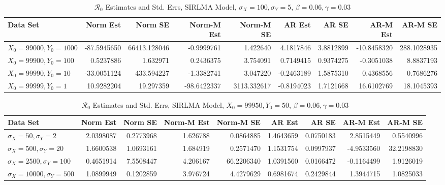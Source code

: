 \message{ !name(draft_v13.tex)}\documentclass[12pt]{article}
\newcommand{\rr}{\ensuremath{\mathcal{R}_0}}
\begin{document}
\begin{table}[H]
	
	\caption{\label{tab:}$\rr$ Estimates and Std. Errs, SIRLMA Model,
		$\sigma_X = 100, \sigma_Y = 5$, $\beta = 0.06, \gamma = 0.03$}
	\centering
	\begin{footnotesize}
		\begin{tabular}[t]{l|r|r|r|r|r|r|r|r}
			\hline
			Data Set & Norm Est & Norm SE & Norm-M Est & Norm-M SE & AR Est & AR SE & AR-M Est & AR-M SE\\
			\hline
			$X_0 = 99000, Y_0 = 1000$ & -87.5945650 & 66413.128046 & -0.9999761 & 1.422640 & 4.1817846 & 3.8812899 & -10.8458320 & 288.1028935\\
			\hline
			$X_0 = 99900, Y_0 = 100$ & 0.5237886 & 1.632971 & 0.2436375 & 3.754091 & 0.7149415 & 0.9374275 & -0.3051038 & 8.8837193\\
			\hline
			$X_0 = 99990, Y_0 = 10$ & -33.0051124 & 433.594227 & -1.3382741 & 3.047220 & -0.2463189 & 1.5875310 & 0.4368556 & 0.7686276\\
			\hline
			$X_0 = 99999, Y_0 = 1$ & 10.9282204 & 19.297359 & -98.6422337 & 3113.332617 & -0.8194023 & 1.7121668 & 16.6102769 & 18.1045393\\
			\hline
		\end{tabular}
	\end{footnotesize}
\end{table}

\begin{table}[H]
	
	\caption{\label{tab:}$\rr$ Estimates and Std. Errs, SIRLMA Model,
		$X_0 = 99950, Y_0 = 50$, $\beta = 0.06, \gamma = 0.03$}
	\centering
	\begin{footnotesize}
		\begin{tabular}[t]{l|r|r|r|r|r|r|r|r}
			\hline
			Data Set & Norm Est & Norm SE & Norm-M Est & Norm-M SE & AR Est & AR SE & AR-M Est & AR-M SE\\
			\hline
			$\sigma_X = 50, \sigma_Y = 2$ & 2.0398087 & 0.2773968 & 1.626788 & 0.0864885 & 1.4643659 & 0.0750183 & 2.8515449 & 0.5540996\\
			\hline
			$\sigma_X = 500, \sigma_Y = 20$ & 1.6600538 & 1.0693161 & 1.684919 & 0.2571470 & 1.1531754 & 0.0997937 & -4.9533560 & 32.2198830\\
			\hline
			$\sigma_X = 2500, \sigma_Y = 100$ & 0.4651914 & 7.5508447 & 4.206167 & 66.2206340 & 1.0391560 & 0.0166472 & -0.1164499 & 1.9126019\\
			\hline
			$\sigma_X = 10000, \sigma_Y = 500$ & 1.0899949 & 0.1202859 & 3.976724 & 4.4279629 & 0.6981674 & 0.2429844 & 1.3944715 & 1.0825033\\
			\hline
		\end{tabular}
	\end{footnotesize}
\end{table}
\end{document}

